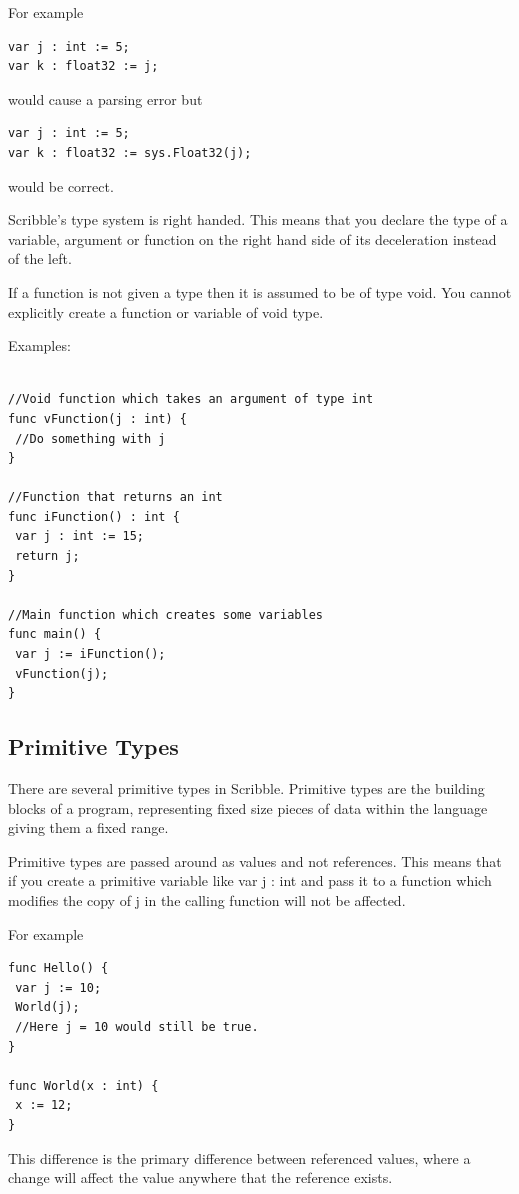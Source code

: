 \documentclass[]{final_report}
\begin{document}
For example
\begin{verbatim}
var j : int := 5;
var k : float32 := j;
\end{verbatim}
would cause a parsing error but
\begin{verbatim}
var j : int := 5;
var k : float32 := sys.Float32(j);
\end{verbatim}
would be correct.


Scribble's type system is right handed. This means that you declare the type of a variable, argument or function on the right hand side of its deceleration instead of the left.

If a function is not given a type then it is assumed to be of type void. You cannot explicitly create a function or variable of void type.

Examples:
\begin{verbatim}

//Void function which takes an argument of type int
func vFunction(j : int) {
 //Do something with j
}

//Function that returns an int
func iFunction() : int {
 var j : int := 15;
 return j;
}

//Main function which creates some variables
func main() {
 var j := iFunction();
 vFunction(j);
}
\end{verbatim}

\subsection{Primitive Types}

There are several primitive types in Scribble. Primitive types are the building blocks of a program, representing fixed size pieces of data within the language giving them a fixed range.

Primitive types are passed around as values and not references. This means that if you create a primitive variable like var j : int and pass it to a function which modifies the copy of j in the calling function will not be affected.

For example \begin{verbatim}
func Hello() {
 var j := 10;
 World(j);
 //Here j = 10 would still be true.
}

func World(x : int) {
 x := 12;
}
\end{verbatim}

This difference is the primary difference between referenced values, where a change will affect the value anywhere that the reference exists.
\end{document}
